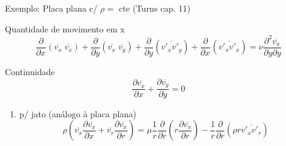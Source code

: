\documentclass[10pt]{beamer}
\newcommand{\ddx}[2]{\dfrac{\partial #1}{\partial x_{#2}}}
\newcommand{\ddxp}[2]{\dfrac{\partial }{\partial x_{#2}}\left(#1\right)}
\newcommand{\m}[1]{\overline{#1}}
\begin{document}
\begin{frame}{Exemplo: Placa plana c/ $\rho = $ cte (Turns cap. 11)}
	
	\begin{block}{Quantidade de movimento em x}
		\begin{equation*}
		\ddxp{\m{v_x}\;\m{v_x}}{}
		+\dfrac{\partial}{\partial y}\left(\m{v_x}\;\m{v_y}\right)
		+\dfrac{\partial}{\partial y}\left(\m{v'_x v'_y}\right)
		+\ddxp{\m{v'_x v'_x}}{}
		=\nu\dfrac{\partial^2 \m{v_x}}{\partial y \partial y}
		\end{equation*}
	\end{block}

	\begin{block}{Continuidade}
		\begin{equation*}
		\ddx{\m{v_x}}{ } + \dfrac{\partial \m{v_y}}{\partial y} = 0
		\end{equation*}
	\end{block}

	\begin{enumerate}[$\bullet$]
		\item p/ jato (análogo à placa plana)
		\begin{equation*}
		\rho\left( \m{v_x} \ddx{\m{v_x}}{ } + \m{v_r}\dfrac{\partial \m{v_x}}{\partial r} \right) = \mu \dfrac{1}{r} \dfrac{\partial}{\partial r}\left( r \dfrac{\partial\m{v_x}}{\partial r} \right) - \dfrac{1}{r}\dfrac{\partial}{\partial r}\left( \rho r \m{v'_x v'_r}\right)
		\end{equation*}
	\end{enumerate}

\end{frame}
\end{document}
